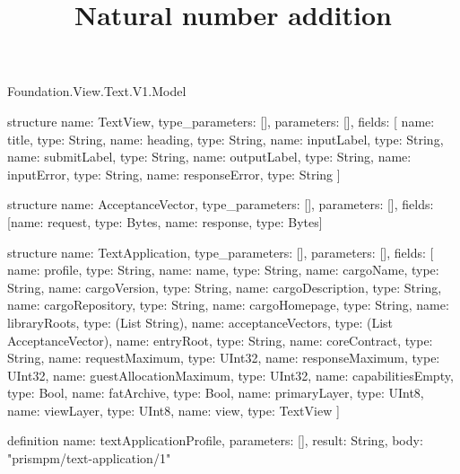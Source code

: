 \begin{lexlean}{Foundation.View.Text.V1.Model}
\title{Natural number addition}
\begin{semanticmodule}
structure{
  name: TextView,
  type_parameters: [],
  parameters: [],
  fields: [
    {name: title, type: String},
    {name: heading, type: String},
    {name: inputLabel, type: String},
    {name: submitLabel, type: String},
    {name: outputLabel, type: String},
    {name: inputError, type: String},
    {name: responseError, type: String}
  ]
}

structure{
  name: AcceptanceVector,
  type_parameters: [],
  parameters: [],
  fields: [{name: request, type: Bytes}, {name: response, type: Bytes}]
}

structure{
  name: TextApplication,
  type_parameters: [],
  parameters: [],
  fields: [
    {name: profile, type: String},
    {name: name, type: String},
    {name: cargoName, type: String},
    {name: cargoVersion, type: String},
    {name: cargoDescription, type: String},
    {name: cargoRepository, type: String},
    {name: cargoHomepage, type: String},
    {name: libraryRoots, type: (List String)},
    {name: acceptanceVectors, type: (List AcceptanceVector)},
    {name: entryRoot, type: String},
    {name: coreContract, type: String},
    {name: requestMaximum, type: UInt32},
    {name: responseMaximum, type: UInt32},
    {name: guestAllocationMaximum, type: UInt32},
    {name: capabilitiesEmpty, type: Bool},
    {name: fatArchive, type: Bool},
    {name: primaryLayer, type: UInt8},
    {name: viewLayer, type: UInt8},
    {name: view, type: TextView}
  ]
}

definition{
  name: textApplicationProfile,
  parameters: [],
  result: String,
  body: "prismpm/text-application/1"
}
\end{semanticmodule}
\end{lexlean}
